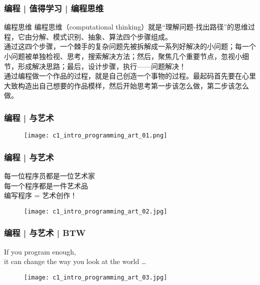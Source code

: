 \begin{frame}
  \frametitle{编程 | 值得学习 | \alert{编程思维}}
  \begin{block}{编程思维}
    编程思维（computational thinking）就是“理解问题-找出路径”的思维过程，它由分解、模式识别、抽象、算法四个步骤组成。\\
    \vspace{1em}
通过这四个步骤，一个棘手的复杂问题先被拆解成一系列好解决的小问题；每一个小问题被单独检视、思考，搜索解决方法；然后，聚焦几个重要节点，忽视小细节，形成解决思路；最后，设计步骤，执行——问题解决！\\
\vspace{1em}
通过编程做一个作品的过程，就是自己创造一个事物的过程。最起码首先要在心里大致构造出自己想要的作品模样，然后开始思考第一步该怎么做，第二步该怎么做。
  \end{block}
\end{frame}

\begin{frame}
  \frametitle{编程 | 与艺术}
  \begin{figure}
    \centering
    \texttt{[image: c1\_intro\_programming\_art\_01.png]}
  \end{figure}
\end{frame}

\begin{frame}
  \frametitle{编程 | 与艺术}
  \begin{center}
    \large{每一位程序员都是一位艺术家\\
    每一个程序都是一件艺术品\\
    编写程序 = 艺术创作！}
\end{center}
\vspace{-1em}
  \begin{figure}
    \centering
    \texttt{[image: c1\_intro\_programming\_art\_02.jpg]}
  \end{figure}
\end{frame}

\begin{frame}
  \frametitle{编程 | 与艺术 | BTW}
  \begin{center}
    \large{If you program enough,\\ it can change the way you look at the world …}
\end{center}
\vspace{-1em}
  \begin{figure}
    \centering
    \texttt{[image: c1\_intro\_programming\_art\_03.jpg]}
  \end{figure}
\end{frame}

